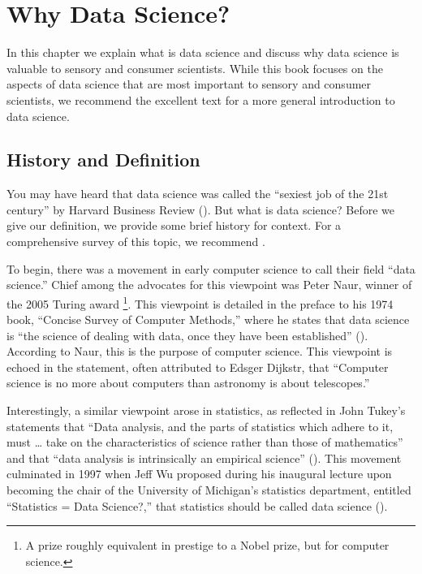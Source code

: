 \documentclass[
]{book}
\begin{document}
\hypertarget{data_science}{%
\chapter{Why Data Science?}\label{data_science}}

In this chapter we explain what is data science and discuss why data science is valuable to sensory and consumer scientists. While this book focuses on the aspects of data science that are most important to sensory and consumer scientists, we recommend the excellent text \citet{Wickham2016} for a more general introduction to data science.

\hypertarget{history-and-definition}{%
\section{History and Definition}\label{history-and-definition}}

You may have heard that data science was called the ``sexiest job of the 21st century'' by Harvard Business Review (\citet{Davenport2012}). But what is data science? Before we give our definition, we provide some brief history for context. For a comprehensive survey of this topic, we recommend \citet{Cao2017}.

To begin, there was a movement in early computer science to call their field ``data science.'' Chief among the advocates for this viewpoint was Peter Naur, winner of the 2005 Turing award \footnote{A prize roughly equivalent in prestige to a Nobel prize, but for computer science.}. This viewpoint is detailed in the preface to his 1974 book, ``Concise Survey of Computer Methods,'' where he states that data science is ``the science of dealing with data, once they have been established'' (\citet{Naur1974}). According to Naur, this is the purpose of computer science. This viewpoint is echoed in the statement, often attributed to Edsger Dijkstr, that ``Computer science is no more about computers than astronomy is about telescopes.''

Interestingly, a similar viewpoint arose in statistics, as reflected in John Tukey's statements that ``Data analysis, and the parts of statistics which adhere to it, must \ldots{} take on the characteristics of science rather than those of mathematics'' and that ``data analysis is intrinsically an empirical science'' (\citet{Tukey1962}). This movement culminated in 1997 when Jeff Wu proposed during his inaugural lecture upon becoming the chair of the University of Michigan's statistics department, entitled ``Statistics = Data Science?,'' that statistics should be called data science (\citet{Wu1997}).
\end{document}
